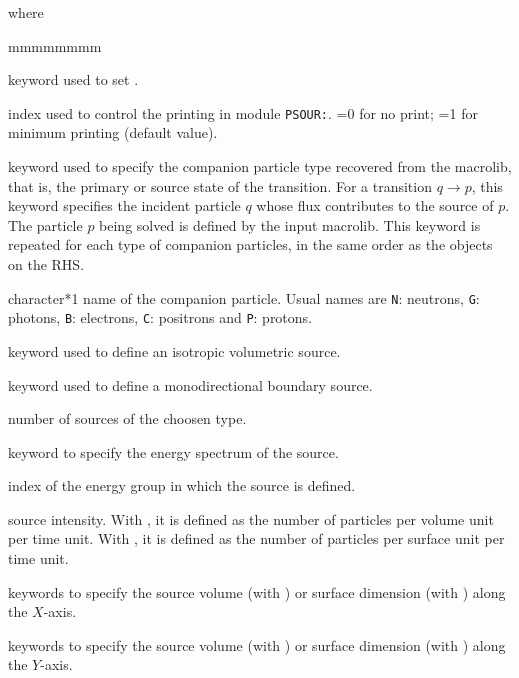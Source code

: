\noindent where
\begin{ListeDeDescription}{mmmmmmmm}

\item[\moc{EDIT}] keyword used to set .

\item[\dusa{iprint}] index used to control the printing in module {\tt PSOUR:}. =0 for no print; =1 for minimum printing (default value).

\item[\moc{PARTICLE}] keyword used to specify the companion particle type
recovered from the {\sc macrolib}, that is, the primary or source state of the
transition. For a transition $q \rightarrow p$, this keyword specifies the
incident particle $q$ whose flux contributes to the source of $p$. The particle
$p$ being solved is defined by the input {\sc macrolib}. This keyword is
repeated for each type of companion particles, in the same order as the
 objects on the RHS.

\item[\dusa{htype}] character*1 name of the companion particle. Usual names are {\tt N}: neutrons, {\tt G}: photons, {\tt B}: electrons,
{\tt C}: positrons and {\tt P}: protons.

\item[\moc{ISO}] keyword used to define an isotropic volumetric source. 

\item[\moc{MONO}] keyword used to define a monodirectional boundary source.

\item[\dusa{nsource}] number of sources of the choosen type.

\item[\moc{INTG}] keyword to specify the energy spectrum of the source.

\item[\dusa{ig}] index of the energy group in which the source is defined.

\item[\dusa{int}] source intensity. With , it is defined as the number of particles per volume unit per time unit. With , it is defined as the number of particles per surface unit per time unit.

\item[\moc{XLIM}] keywords to specify the  source volume (with ) or surface dimension (with ) along the $X$-axis.

\item[\moc{YLIM}] keywords to specify the  source volume (with ) or surface dimension (with ) along the $Y$-axis.


\end{ListeDeDescription}
